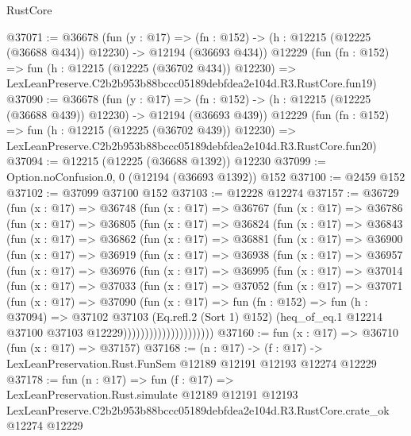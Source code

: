 \begin{lexlean}{RustCore}
\begin{coremodule}
@37071 := @36678
    (fun (y : @17) =>
    (fn : @152) -> (h : @12215 (@12225 (@36688 @434)) @12230) -> @12194 (@36693 @434))
    @12229
    (fun (fn : @152) =>
    fun (h : @12215 (@12225 (@36702 @434)) @12230) =>
    LexLeanPreserve.C2b2b953b88bccc05189debfdea2e104d.R3.RustCore.fun19)
@37090 := @36678
    (fun (y : @17) =>
    (fn : @152) -> (h : @12215 (@12225 (@36688 @439)) @12230) -> @12194 (@36693 @439))
    @12229
    (fun (fn : @152) =>
    fun (h : @12215 (@12225 (@36702 @439)) @12230) =>
    LexLeanPreserve.C2b2b953b88bccc05189debfdea2e104d.R3.RustCore.fun20)
@37094 := @12215 (@12225 (@36688 @1392)) @12230
@37099 := Option.noConfusion.{0, 0} (@12194 (@36693 @1392)) @152
@37100 := @2459 @152
@37102 := @37099 @37100 @152
@37103 := @12228 @12274
@37157 := @36729
    (fun (x : @17) =>
    @36748
      (fun (x : @17) =>
      @36767
        (fun (x : @17) =>
        @36786
          (fun (x : @17) =>
          @36805
            (fun (x : @17) =>
            @36824
              (fun (x : @17) =>
              @36843
                (fun (x : @17) =>
                @36862
                  (fun (x : @17) =>
                  @36881
                    (fun (x : @17) =>
                    @36900
                      (fun (x : @17) =>
                      @36919
                        (fun (x : @17) =>
                        @36938
                          (fun (x : @17) =>
                          @36957
                            (fun (x : @17) =>
                            @36976
                              (fun (x : @17) =>
                              @36995
                                (fun (x : @17) =>
                                @37014
                                  (fun (x : @17) =>
                                  @37033
                                    (fun (x : @17) =>
                                    @37052
                                      (fun (x : @17) =>
                                      @37071
                                        (fun (x : @17) =>
                                        @37090
                                          (fun (x : @17) =>
                                          fun (fn : @152) =>
                                          fun (h : @37094) =>
                                          @37102
                                            @37103
                                            (Eq.refl.{2} (Sort 1) @152)
                                            (heq_of_eq.{1}
                                              @12214
                                              @37100
                                              @37103
                                              @12229)))))))))))))))))))))
@37160 := fun (x : @17) => @36710 (fun (x : @17) => @37157)
@37168 := (n : @17) ->
  (f : @17) -> LexLeanPreservation.Rust.FunSem @12189 @12191 @12193 @12274 @12229
@37178 := fun (n : @17) =>
  fun (f : @17) =>
  LexLeanPreservation.Rust.simulate
    @12189
    @12191
    @12193
    LexLeanPreserve.C2b2b953b88bccc05189debfdea2e104d.R3.RustCore.crate_ok
    @12274
    @12229
\end{coremodule}
\end{lexlean}
